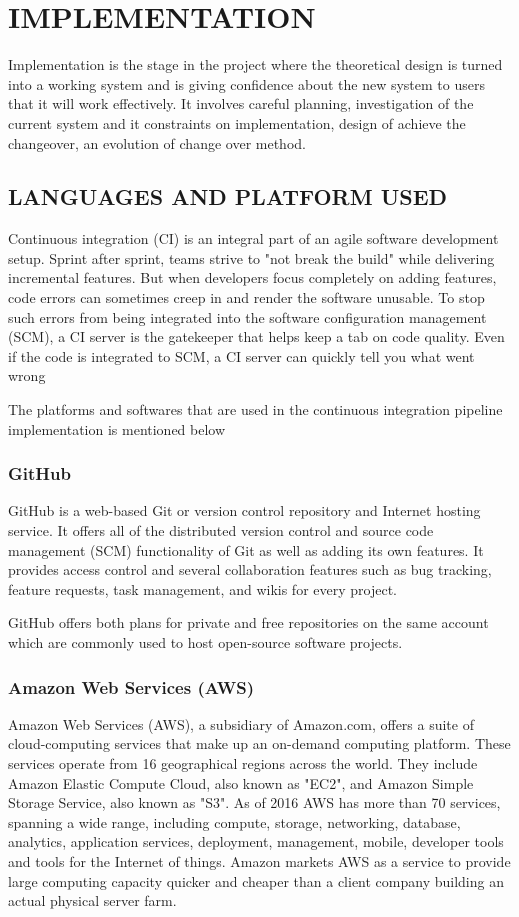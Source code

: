 \documentclass[12pt,a4paper,oneside]{report}
\begin{document}
{\chapter{IMPLEMENTATION}
Implementation is the stage in the project where the theoretical design is turned into a working system and is giving confidence about the new system to users that it will work effectively. It involves careful planning, investigation of the current system and it constraints on implementation, design of achieve the changeover, an evolution of change over method.

\section{LANGUAGES AND PLATFORM USED}
\par Continuous integration (CI) is an integral part of an agile software development setup. Sprint after sprint, teams strive to "not break the build" while delivering incremental features. But when developers focus completely on adding features, code errors can sometimes creep in and render the software unusable. To stop such errors from being integrated into the software configuration management (SCM), a CI server is the gatekeeper that helps keep a tab on code quality. Even if the code is integrated to SCM, a CI server can quickly tell you what went wrong
\par
	The platforms and softwares that are used in the continuous integration pipeline implementation is mentioned below 
\subsection{GitHub}
\par GitHub is a web-based Git or version control repository and Internet hosting service. It offers all of the distributed version control and source code management (SCM) functionality of Git as well as adding its own features. It provides access control and several collaboration features such as bug tracking, feature requests, task management, and wikis for every project.
\par
GitHub offers both plans for private and free repositories on the same account which are commonly used to host open-source software projects. 
\subsection{Amazon Web Services (AWS)}
\par Amazon Web Services (AWS), a subsidiary of Amazon.com, offers a suite of cloud-computing services that make up an on-demand computing platform. These services operate from 16 geographical regions across the world. They include Amazon Elastic Compute Cloud, also known as "EC2", and Amazon Simple Storage Service, also known as "S3". As of 2016 AWS has more than 70 services, spanning a wide range, including compute, storage, networking, database, analytics, application services, deployment, management, mobile, developer tools and tools for the Internet of things. Amazon markets AWS as a service to provide large computing capacity quicker and cheaper than a client company building an actual physical server farm.\\
}
\end{document}
